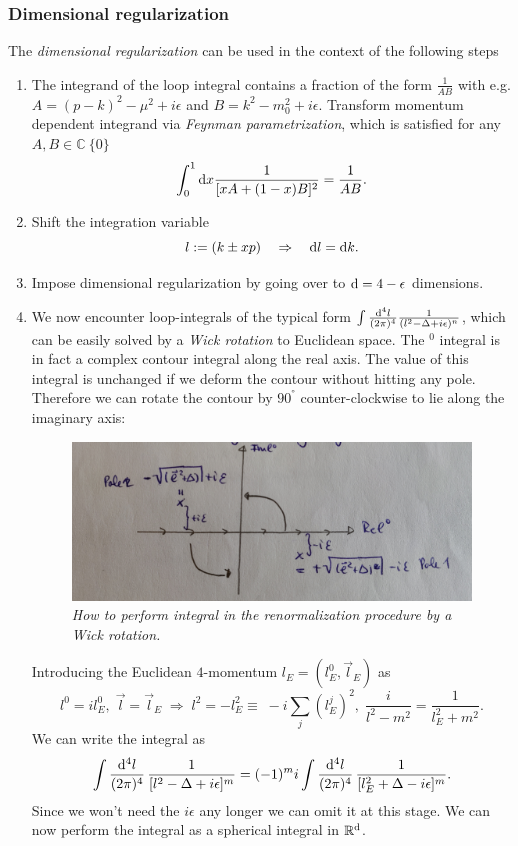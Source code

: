 \subsubsection{Dimensional regularization}
\label{subsubsec:renormalizationDimReg}
The \emph{dimensional regularization} can be used in the context of the following steps
\begin{enumerate}
	\item The integrand of the loop integral contains a fraction of the form $\frac{1}{AB}$ with e.g. $A=(p-k)^2-\mu^2+i \epsilon$ and $B=k^2-m^2_0+i\epsilon$. Transform momentum dependent integrand via \emph{Feynman parametrization},  which is satisfied for any $A,B \in \mathbb{C}\ \{0\}$ 
	\begin{equation}
		\int_0^1 \mathrm{d} x \frac{1}{[xA+(1-x)B]^2} = \frac{1}{AB}.
	\end{equation}
	\item Shift the integration variable 
	\begin{equation*}
		l:= (k \pm xp) \quad \Rightarrow \quad \mathrm{d} l=\mathrm{d} k.
	\end{equation*}
	\item Impose dimensional regularization by going over to $\mathrm{d}=4-\epsilon$ dimensions.
	\item We now encounter loop-integrals of the typical form $\int \frac{\mathrm{d}^4 l}{(2 \pi)^4} \frac{1}{(l^2-\Delta +i \epsilon)^n}$, which can be easily solved by a \emph{Wick rotation} to Euclidean space.	The $^0$ integral is in fact a complex contour integral along the real axis. The value of this integral is unchanged if we deform the contour without hitting any pole. Therefore we can rotate the contour by $90^°$ counter-clockwise to lie along the imaginary axis:
	\begin{figure}
		\centering
		\includegraphics[width=0.7\linewidth]{gfx/Wickrotation}
		\caption{\itshape How to perform integral in the renormalization procedure by a Wick rotation.}
		\label{fig:wickrotation}
	\end{figure}

	Introducing the Euclidean $4$-momentum $l_E = (l^0_E, \vec{l}_E)$ as 
	\begin{equation}
	l^0=i l^0_E, \; \vec{l}=\vec{l}_E \; \Rightarrow \; l^2=-l^2_E\equiv \; -i \sum_j (l^j_E)^2, \; \frac{i}{l^2-m^2}=\frac{1}{l^2_E+m^2}.
	\end{equation}
	We can write the integral as
	\begin{equation}
	\int \frac{\mathrm{d}^4 l}{(2 \pi)^4} \, \frac{1}{[l^2-\Delta+i\epsilon]^m} = (-1)^m i \int \frac{\mathrm{d}^4 l}{(2 \pi)^4} \, \frac{1}{[l^2_E+\Delta - i \epsilon]^m}.
	\end{equation}
	Since we won't need the $i\epsilon$ any longer we can omit it at this stage. We can now perform the integral as a spherical integral in $\mathbb{R}^{\mathrm{d}}$.
	

\end{enumerate}

